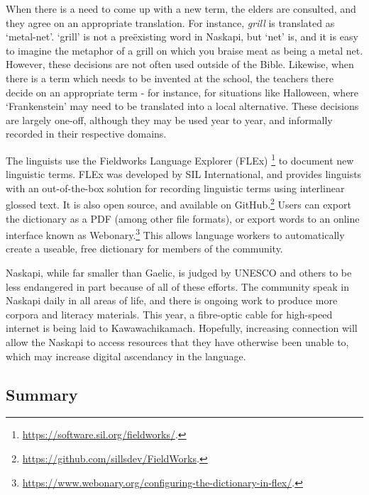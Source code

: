 When there is a need to come up with a new term, the elders are consulted, and they agree on an appropriate translation. For instance, {\it grill} is translated as `metal-net'. `grill' is not a  pre\"{e}xisting word in Naskapi, but `net' is, and it is easy to imagine the metaphor of a grill on which you braise meat as being a metal net. However, these decisions are not often used outside of the Bible. Likewise, when there is a term which needs to be invented at the school, the teachers there decide on an appropriate term - for instance, for situations like Halloween, where `Frankenstein' may need to be translated into a local alternative. These decisions are largely one-off, although they may be used year to year, and informally recorded in their respective domains.

The linguists use the Fieldworks Language Explorer (FLEx) \footnote{\href{https://software.sil.org/fieldworks/}{https://software.sil.org/fieldworks/}. } to document new linguistic terms. FLEx was developed by SIL International, and provides linguists with an out-of-the-box solution for recording linguistic terms using interlinear glossed text. It is also open source, and available on GitHub.\footnote{\href{https://github.com/sillsdev/FieldWorks}{https://github.com/sillsdev/FieldWorks}. } Users can export the dictionary as a PDF (among other file formats), or export words to an online interface known as Webonary.\footnote{\href{https://www.webonary.org/configuring-the-dictionary-in-flex/}{https://www.webonary.org/configuring-the-dictionary-in-flex/}. } This allows language workers to automatically create a useable, free dictionary for members of the community.

Naskapi, while far smaller than Gaelic, is judged by UNESCO and others to be less endangered in part because of all of these efforts. The community speak in Naskapi daily in all areas of life, and there is ongoing work to produce more corpora and literacy materials. This year, a fibre-optic cable for high-speed internet is being laid to Kawawachikamach. Hopefully, increasing connection will allow the Naskapi to access resources that they have otherwise been unable to, which may increase digital ascendancy in the language. 

\subsection{Summary}

